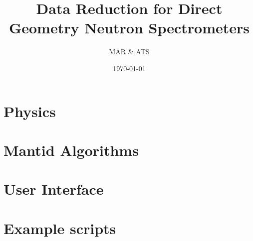 \documentclass[11pt]{article}
\numberwithin{equation}{section}
\numberwithin{figure}{section}
\begin{document}
\title{Data Reduction for Direct Geometry Neutron Spectrometers}
\author{MAR \& ATS}
\date{\today}
\maketitle

\section{Physics}\label{Physics}

\section{Mantid Algorithms}\label{Algs}

\section{User Interface}\label{UI}

\section{Example scripts}\label{Examples}

\end{document}
